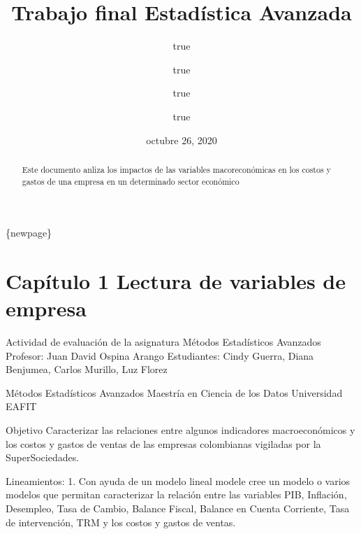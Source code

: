 \documentclass[
  11pt,
]{article}
\title{Trabajo final Estadística Avanzada}
\author{true \and true \and true \and true}
\date{octubre 26, 2020}
\begin{document}
\maketitle
\begin{abstract}
Este documento anliza los impactos de las variables macoreconómicas en
los costos y gastos de una empresa en un determinado sector económico
\end{abstract}

{
\setcounter{tocdepth}{3}
\tableofcontents
}
\{newpage\}

\hypertarget{capuxedtulo-1-lectura-de-variables-de-empresa}{%
\section{Capítulo 1 Lectura de variables de
empresa}\label{capuxedtulo-1-lectura-de-variables-de-empresa}}

Actividad de evaluación de la asignatura Métodos Estadísticos Avanzados
Profesor: Juan David Ospina Arango Estudiantes: Cindy Guerra, Diana
Benjumea, Carlos Murillo, Luz Florez

Métodos Estadísticos Avanzados Maestría en Ciencia de los Datos
Universidad EAFIT

Objetivo Caracterizar las relaciones entre algunos indicadores
macroeconómicos y los costos y gastos de ventas de las empresas
colombianas vigiladas por la SuperSociedades.

Lineamientos: 1. Con ayuda de un modelo lineal modele cree un modelo o
varios modelos que permitan caracterizar la relación entre las variables
PIB, Inflación, Desempleo, Tasa de Cambio, Balance Fiscal, Balance en
Cuenta Corriente, Tasa de intervención, TRM y los costos y gastos de
ventas.
\end{document}
